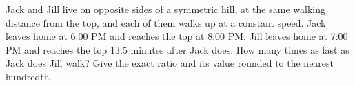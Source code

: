 Jack and Jill live on opposite sides of a symmetric hill, at the same walking distance from the top, and each of them walks up at a constant speed. Jack leaves home at 6:00 PM and reaches the top at 8:00 PM. Jill leaves home at 7:00 PM and reaches the top $13.5$ minutes after Jack does. How many times as fast as Jack does Jill walk? Give the exact ratio and its value rounded to the nearest hundredth.
